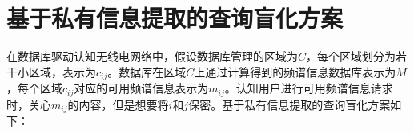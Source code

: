 
\chapter{基于私有信息提取的查询盲化方案}
\label{chap:updatelog}

在数据库驱动认知无线电网络中，假设数据库管理的区域为$C$，每个区域划分为若干小区域，表示为$c_{ij}$。数据库在区域$C$上通过计算得到的频谱信息数据库表示为$M$，每个区域$c_{ij}$对应的可用频谱信息表示为$m_{ij}$。认知用户进行可用频谱信息请求时，关心$m_{ij}$的内容，但是想要将$i$和$j$保密。基于私有信息提取的查询盲化方案如下：


